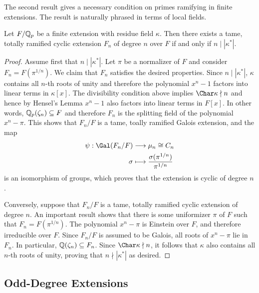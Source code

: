 The second result gives a necessary condition on primes ramifying in finite extensions. The result is naturally phrased in terms of local fields.

\begin{prop}\label{prop_totally_ramified}
    Let $F/\mathbb{Q}_p$ be a finite extension with residue field $\kappa$. Then there exists a tame, totally ramified cyclic extension $F_n$ of degree $n$ over $F$ if and only if $n\mid|\kappa^*|$.
\end{prop}

\begin{proof}
    Assume first that $n\mid|\kappa^*|$. Let $\pi$ be a normalizer of $F$ and consider $F_n=F(\pi^{1/n})$. We claim that $F_n$ satisfies the desired properties. Since $n\mid|\kappa^*|$, $\kappa$ contains all $n$-th roots of unity and therefore the polynomial $x^n-1$ factors into linear terms in $\kappa[x]$. The divisibility condition above implies $\Char\kappa\nmid n$ and hence by Hensel's Lemma $x^n-1$ also factors into linear terms in $F[x]$. In other words, $\mathbb{Q}_p(\zeta_n)\subseteq F$ and therefore $F_n$ is the splitting field of the polynomial $x^n-\pi$. This shows that $F_n/F$ is a tame, toally ramified Galois extension, and the map 
    \begin{align*}
        \psi: \Gal(F_n/F)&\longrightarrow \mu_n\cong C_n\\
        \sigma &\longmapsto \frac{\sigma(\pi^{1/n})}{\pi^{1/n}}
    \end{align*}
    is an isomorphism of groups, which proves that the extension is cyclic of degree $n$.

    Conversely, suppose that $F_n/F$ is a tame, totally ramified cyclic extension of degree $n$. An important result shows that there is some uniformizer $\pi$ of $F$ such that $F_n=F(\pi^{1/n})$. The polynomial $x^n-\pi$ is Einstein over $F$, and therefore irreducible over $F$. Since $F_n/F$ is assumed to be Galois, all roots of $x^n-\pi$ lie in $F_n$. In particular, $\mathbb{Q}(\zeta_n)\subseteq F_n$. Since $\Char\kappa\nmid n$, it follows that $\kappa$ also contains all $n$-th roots of unity, proving that $n\nmid|\kappa^*|$ as desired. 
\end{proof}





\subsection{Odd-Degree Extensions}
